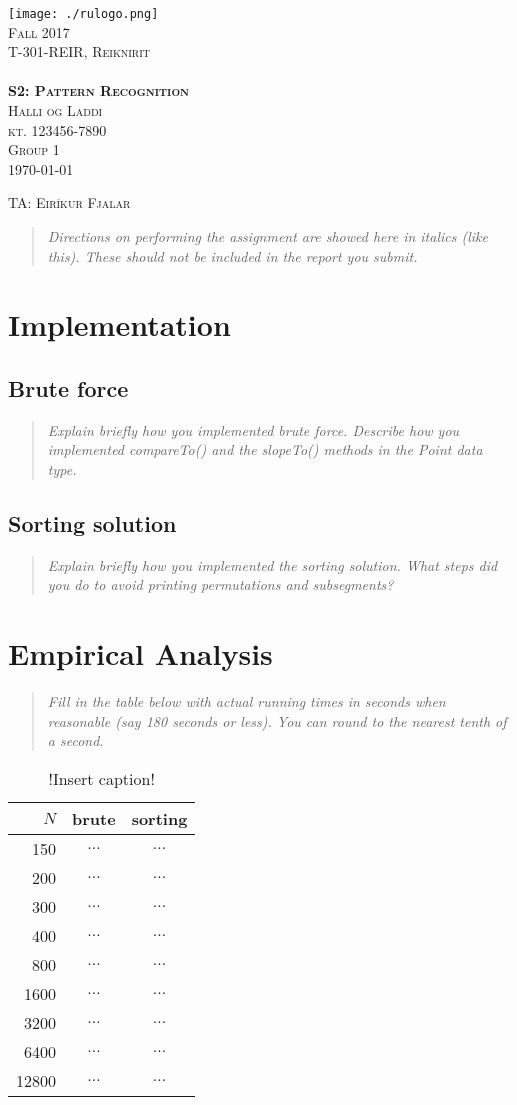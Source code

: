 \documentclass[11pt,a4paper,notitlepage]{article}
\newcommand{\semester}{Fall 2017}
\newcommand{\coursename}{Reiknirit}
\newcommand{\courseid}{T-301-REIR}
\newcommand{\assignment}{S2: Pattern Recognition}
\newcommand{\dateofcompilation}{\today}
\newcommand{\ssn}{kt. 123456-7890}              %
\newcommand{\group}{1}
\newcommand{\teachingassistant}{TA: Eiríkur Fjalar}   %
\newcommand{\students}{
    Halli og Laddi                             %
}
\newcommand{\maketitlepage}[1]
{
    \begin{titlepage}

        \begin{center}
            \texttt{[image: ./rulogo.png]}\\[1.5cm]

            \textsc{\huge \semester}\\[0.8cm]

            {\textsc{\Huge \courseid, \coursename}}\\[0.4cm]
            \textsc{\LARGE }\\[2.5cm]

            \textbf{\textsc{\Huge #1}}\\[3cm]


            \textsc{\huge \students}\\[0.4cm]
            \textsc{\LARGE \ssn}\\[0.4cm]
            \textsc{\LARGE Group \group}\\[1cm]
            \textsc{\Large \dateofcompilation}


        \end{center}

        \vfill

        \begin{flushleft}
            \textsc{\Large \teachingassistant}
        \end{flushleft}

    \end{titlepage}
}
\newcommand{\explanation}[1]{\begin{quote}\emph{#1} \end{quote}}  %
\begin{document}
    \maketitlepage{\assignment}

\explanation{Directions on performing the assignment are showed here in italics (like this). These should not be included in the report you submit.}

\section{Implementation}

\subsection*{Brute force}

\explanation{Explain \emph{briefly} how you implemented brute force.
            Describe how you implemented compareTo() and the
            slopeTo() methods in the Point data type.}

\subsection*{Sorting solution}
\explanation{Explain \emph{briefly} how you implemented the sorting solution.
           What steps did you do to avoid printing permutations
           and subsegments?}

\section{Empirical Analysis}
\explanation{Fill in the table below with actual running times in
seconds when reasonable (say 180 seconds or less).
You can round to the nearest tenth of a second.}

\begin{table}[htbp]
  \centering
  \caption{!Insert caption!}
        \label{tab:table1}
        \begin{tabular}{|r| c | c |}
        \hline
        $N$ & brute & sorting \\ 
        \hline
        150 & $\ldots$ & $\ldots$ \\
        200 & $\ldots$ & $\ldots$ \\
        300 & $\ldots$ & $\ldots$ \\
        400 & $\ldots$ & $\ldots$ \\
        800 & $\ldots$ & $\ldots$ \\
        1600 & $\ldots$ & $\ldots$ \\
        3200 & $\ldots$ & $\ldots$ \\
        6400 & $\ldots$ & $\ldots$ \\
        12800 & $\ldots$ & $\ldots$ \\
        \hline
        \end{tabular}
\end{table}
\end{document}
